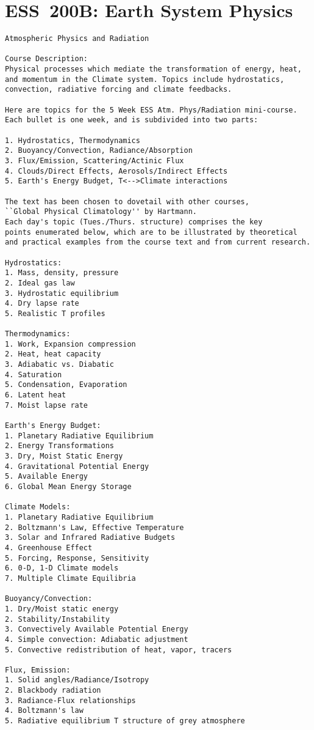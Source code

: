 \documentclass[12pt,twoside]{article}
\begin{document}
\section{ESS~200B: Earth System Physics}
\begin{verbatim}
Atmospheric Physics and Radiation

Course Description:
Physical processes which mediate the transformation of energy, heat, 
and momentum in the Climate system. Topics include hydrostatics,
convection, radiative forcing and climate feedbacks.

Here are topics for the 5 Week ESS Atm. Phys/Radiation mini-course.
Each bullet is one week, and is subdivided into two parts:

1. Hydrostatics, Thermodynamics
2. Buoyancy/Convection, Radiance/Absorption
3. Flux/Emission, Scattering/Actinic Flux
4. Clouds/Direct Effects, Aerosols/Indirect Effects
5. Earth's Energy Budget, T<-->Climate interactions

The text has been chosen to dovetail with other courses,
``Global Physical Climatology'' by Hartmann.
Each day's topic (Tues./Thurs. structure) comprises the key 
points enumerated below, which are to be illustrated by theoretical
and practical examples from the course text and from current research.

Hydrostatics:
1. Mass, density, pressure
2. Ideal gas law
3. Hydrostatic equilibrium
4. Dry lapse rate
5. Realistic T profiles

Thermodynamics:
1. Work, Expansion compression
2. Heat, heat capacity
3. Adiabatic vs. Diabatic
4. Saturation
5. Condensation, Evaporation
6. Latent heat
7. Moist lapse rate

Earth's Energy Budget:
1. Planetary Radiative Equilibrium
2. Energy Transformations
3. Dry, Moist Static Energy
4. Gravitational Potential Energy
5. Available Energy
6. Global Mean Energy Storage

Climate Models:
1. Planetary Radiative Equilibrium
2. Boltzmann's Law, Effective Temperature
3. Solar and Infrared Radiative Budgets
4. Greenhouse Effect
5. Forcing, Response, Sensitivity
6. 0-D, 1-D Climate models
7. Multiple Climate Equilibria

Buoyancy/Convection:
1. Dry/Moist static energy
2. Stability/Instability
3. Convectively Available Potential Energy
4. Simple convection: Adiabatic adjustment
5. Convective redistribution of heat, vapor, tracers

Flux, Emission:
1. Solid angles/Radiance/Isotropy
2. Blackbody radiation 
3. Radiance-Flux relationships
4. Boltzmann's law
5. Radiative equilibrium T structure of grey atmosphere


\end{verbatim}
\end{document}
